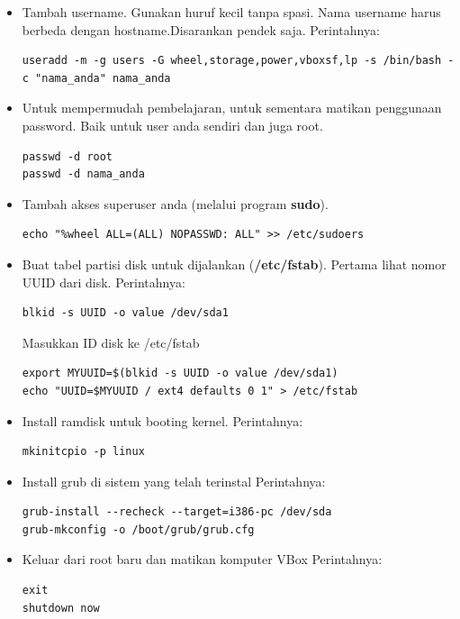 \documentclass[12pt,]{article}
\begin{document}
\begin{itemize}
		\item Tambah username. Gunakan huruf kecil tanpa spasi.
		Nama username harus berbeda dengan hostname.Disarankan pendek saja.
		Perintahnya:
		\begin{verbatim}
useradd -m -g users -G wheel,storage,power,vboxsf,lp -s /bin/bash -c "nama_anda" nama_anda

		\end{verbatim}

		\item Untuk mempermudah pembelajaran, untuk sementara matikan penggunaan password.
		Baik untuk user anda sendiri dan juga root.
		\begin{verbatim}
passwd -d root
passwd -d nama_anda
		\end{verbatim}

		\item Tambah akses superuser anda (melalui program \textbf{sudo}).
		\begin{verbatim}
echo "%wheel ALL=(ALL) NOPASSWD: ALL" >> /etc/sudoers
		\end{verbatim}

		\item Buat tabel partisi disk untuk dijalankan (\textbf{/etc/fstab}).
		Pertama lihat nomor UUID dari disk. Perintahnya:
		\begin{verbatim}
blkid -s UUID -o value /dev/sda1
		\end{verbatim}
		Masukkan ID disk ke /etc/fstab
		\begin{verbatim}
export MYUUID=$(blkid -s UUID -o value /dev/sda1)
echo "UUID=$MYUUID / ext4 defaults 0 1" > /etc/fstab
		\end{verbatim}

		\item Install ramdisk untuk booting kernel.
		Perintahnya:
		\begin{verbatim}
mkinitcpio -p linux
		\end{verbatim}

		\item Install grub di sistem yang telah terinstal
		Perintahnya:
		\begin{verbatim}
grub-install --recheck --target=i386-pc /dev/sda
grub-mkconfig -o /boot/grub/grub.cfg
		\end{verbatim}

		\item Keluar dari root baru dan matikan komputer VBox
		Perintahnya:
		\begin{verbatim}
exit
shutdown now
		\end{verbatim}

	\end{itemize}
\end{document}
